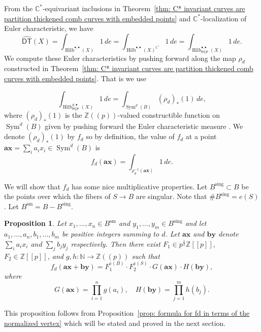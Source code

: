 \documentclass[12pt]{amsart}
\newtheorem{proposition}[theorem]{Proposition}
\theoremstyle{definition}
\newcommand{\CC} {\mathbb{C}}          %
\newcommand{\NN} {\mathbb{N}}		%
\newcommand{\ZZ} {\mathbb{Z}}		%
\newcommand{\Sym}{\operatorname{Sym}}
\newcommand{\Hilb}{\operatorname{Hilb}}
\newcommand{\DT}{\mathsf{DT}}
\newcommand{\sm}{\operatorname{sm}}
\newcommand{\sing}{\operatorname{sing}}
\newcommand{\boldx}{\boldsymbol{x}}
\newcommand{\boldy}{\boldsymbol{y}}
\newcommand{\bolda}{\boldsymbol{a}}
\newcommand{\boldb}{\boldsymbol{b}}
\newcommand{\DThat}{\widehat{\DT}}
\newcommand{\PCP}{\mathsf{PCP}}
\begin{document}
From the $\CC^{*}$-equivariant inclusions in Theorem~\ref{thm: C*
invariant curves are partition thickened comb curves with embedded
points} and $\CC^{*}$-localization of Euler characteristic, we have
\[
\DThat (X) = \int_{\Hilb^{\bullet ,\bullet}(X)} 1 \, de  =
\int_{\Hilb^{\bullet ,\bullet}(X)^{\CC^{*}}} 1 \, de  = \int_{\Hilb^{\bullet
,\bullet}_{\PCP }(X)} 1 \, de  .
\]
We compute these Euler characteristics by pushing forward along the
map $\rho_{d}$ constructed in Theorem~\ref{thm: C* invariant curves are partition thickened
comb curves with embedded points}. That is we use

$$
\int_{\Hilb^{d,\bullet}_{\PCP }(X)} 1 \, de = \int_{\Sym^d(B)} (\rho_{d})_{*}(1) \, de,
$$
where $(\rho_{d})_{*}(1)$ is the $\ZZ (\!(p)\!)$-valued constructible
function on $\Sym^d(B)$ given by pushing forward the Euler
characteristic measure \cite{MacPherson-Annals74}. We denote
$(\rho_{d})_{*}(1)$ by $f_{d}$ so by definition, the value of $f_{d} $
at a point $\bolda \boldx =\sum_{i}a_{i}x_{i} \in \Sym^d(B)$ is
$$
f_d(\bolda \boldx ) = \int_{\rho_{d}^{-1}(\bolda \boldx )} 1 \, de.
$$

We will show that $f_{d}$ has some nice multiplicative properties. Let
$B^{\sing}\subset B$ be the points over which the fibers of $S\to B$
are singular. Note that $\# B^{\sing}=e(S)$. Let
$B^{\sm}=B-B^{\sing}$.

\begin{proposition}\label{prop: fd = F1*F2*G*H}
Let $x_{1},\dotsc ,x_{n}\in B^{\sm}$ and $y_{1},\dotsc ,y_{m}\in
B^{\sing}$ and let $a_{1},\dotsc ,a_{n},b_{1},\dotsc ,b_{m}$ be
positive integers summing to $d$. Let $\bolda \boldx$ and $\boldb
\boldy$ denote $\sum_{i}a_{i}x_{i}$ and $\sum_{j}b_{j}y_{j}$
respectively. Then there exist $F_{1} \in p^{\frac{1}{2}} \ZZ [[p]]$,
$F_{2}\in \ZZ [[p]]$, and $g,h:\NN \to \ZZ (\!(p)\!)$ such that
\[
f_{d}(\bolda \boldx +\boldb \boldy ) = F_{1}^{e(B)}\cdot
F_{2}^{e(S)}\cdot G(\bolda \boldx )\cdot H(\boldb \boldy ),
\]
where
\[
G(\bolda \boldx ) = \prod_{i=1}^{n}g(a_{i}), \quad H(\boldb \boldy ) =
\prod_{j=1}^{m}h(b_{j}).
\]
\end{proposition}
This proposition follows from Proposition~\ref{prop: formula for fd in
terms of the normalized vertex} which will be stated and proved in the
next section.
\end{document}
